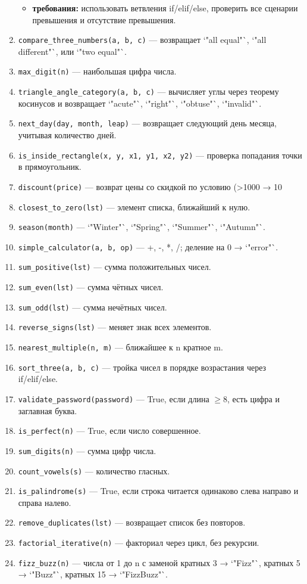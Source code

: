 \begin{enumerate}
\begin{itemize}
        \item \textbf{требования:} использовать ветвления if/elif/else, проверить все сценарии превышения и отсутствие превышения.  
    \end{itemize}
    \item \texttt{compare\_three\_numbers(a, b, c)} — возвращает `"all equal"`, `"all different"`, или `"two equal"`.  
    \item \texttt{max\_digit(n)} — наибольшая цифра числа.  
    \item \texttt{triangle\_angle\_category(a, b, c)} — вычисляет углы через теорему косинусов и возвращает `"acute"`, `"right"`, `"obtuse"`, `"invalid"`.  
    \item \texttt{next\_day(day, month, leap)} — возвращает следующий день месяца, учитывая количество дней.  
    \item \texttt{is\_inside\_rectangle(x, y, x1, y1, x2, y2)} — проверка попадания точки в прямоугольник.  
    \item \texttt{discount(price)} — возврат цены со скидкой по условию (>1000 → 10%
    \item \texttt{closest\_to\_zero(lst)} — элемент списка, ближайший к нулю.  
    \item \texttt{season(month)} — `"Winter"`, `"Spring"`, `"Summer"`, `"Autumn"`.  
    \item \texttt{simple\_calculator(a, b, op)} — +, -, *, /; деление на 0 → `"error"`.  
    \item \texttt{sum\_positive(lst)} — сумма положительных чисел.  
    \item \texttt{sum\_even(lst)} — сумма чётных чисел.  
    \item \texttt{sum\_odd(lst)} — сумма нечётных чисел.  
    \item \texttt{reverse\_signs(lst)} — меняет знак всех элементов.  
    \item \texttt{nearest\_multiple(n, m)} — ближайшее к n кратное m.  
    \item \texttt{sort\_three(a, b, c)} — тройка чисел в порядке возрастания через if/elif/else.  
    \item \texttt{validate\_password(password)} — True, если длина $\geqslant$8, есть цифра и заглавная буква.  
    \item \texttt{is\_perfect(n)} — True, если число совершенное.  
    \item \texttt{sum\_digits(n)} — сумма цифр числа.  
    \item \texttt{count\_vowels(s)} — количество гласных.  
    \item \texttt{is\_palindrome(s)} — True, если строка читается одинаково слева направо и справа налево.  
    \item \texttt{remove\_duplicates(lst)} — возвращает список без повторов.  
    \item \texttt{factorial\_iterative(n)} — факториал через цикл, без рекурсии.  
    \item \texttt{fizz\_buzz(n)} — числа от 1 до n с заменой кратных 3 → `"Fizz"`, кратных 5 → `"Buzz"`, кратных 15 → `"FizzBuzz"`.  
\end{enumerate}
